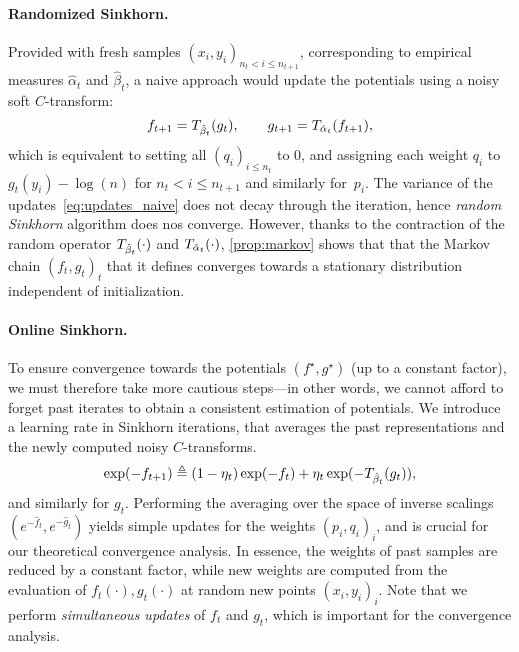 \paragraph{Randomized Sinkhorn.}
Provided with fresh samples $(x_i, y_i)_{n_t < i \leq n_{t+1}}$, 
corresponding to empirical measures $\hat \alpha_t$ and $\hat \beta_t$, a naive approach would 
 update the potentials using a noisy soft $C$-transform:
\begin{equation}\label{eq:updates_naive}
     f_{t+1} = \Ctrans{g_t}{\hat \beta_t},
    \qquad g_{t+1} = \Ctrans{f_{t+1}}{\hat \alpha_t},
\end{equation}
which is equivalent to setting all $(q_i)_{i \leq n_t}$ to $0$, and assigning each weight
 $q_i$ to $g_t(y_i) - \log(n)$ for $n_t < i \leq  n_{t+1}$ and similarly for~$p_i$.
%
The variance of the updates~\eqref{eq:updates_naive} does not decay through the
iteration, hence \textit{random Sinkhorn} algorithm does nos converge.
However, thanks to the contraction of the random operator $\Ctrans{\cdot}{\hat
\beta_t}$ and $\Ctrans{\cdot}{\hat \alpha_t}$, \autoref{prop:markov} shows that
that the Markov chain ${(f_t, g_t)}_t$ that it defines converges towards a
stationary distribution independent of initialization.

\paragraph{Online Sinkhorn.}

To ensure convergence towards the potentials $(f^\star, g^\star)$ (up to a
constant factor), we must therefore take more cautious steps---in other words,
we cannot afford to forget past iterates to obtain a consistent estimation of
potentials. We introduce a learning rate in Sinkhorn iterations, that averages
the past representations and the newly computed noisy $C$-transforms.
\begin{equation}\label{eq:updates}
    \exp(-f_{t+1})
    \eqdef (1 - \eta_t) \exp(-f_t) 
    + \eta_t 
    \exp(-\Ctrans{g_t}{\hat \beta_t}),
\end{equation}
and similarly for $g_t$. Performing the averaging over the space of inverse
scalings $(e^{-\hat f_{t}},e^{-\hat g_{t}})$ yields simple updates for the
weights ${(p_i,q_i)}_i$, and is crucial for our theoretical convergence
analysis. In essence, the weights of past samples are reduced by a constant
factor, while new weights are computed from the evaluation of $f_t(\cdot),
g_t(\cdot)$ at random new points ${(x_i, y_i)}_i$. Note that we perform
\textit{simultaneous updates} of $f_t$ and $g_t$, which is important for the
convergence analysis.

